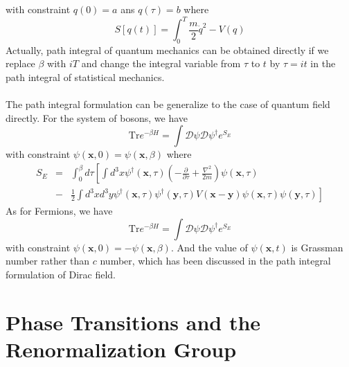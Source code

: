 with constraint $q(0) = a$ ans $q(\tau) = b$
where
\[S[q(t)] = \int_0^{T} \frac{m}{2}\dot{q}^2 - V(q)\]
Actually, path integral of quantum mechanics can be obtained directly if we replace $\beta$ with $iT$ and change the integral variable from $\tau$ to $t$ by $\tau = it$ in the path integral  of statistical mechanics.
\\ \\
The path integral formulation can be generalize to the case of quantum field directly. For the system of bosons, we have
\[\mathrm{Tr}e^{-\beta H} = \int \mathcal{D}\psi \mathcal{D}\psi^{\dagger} e^{S_E}\]
with constraint $\psi(\bm{x},0) = \psi(\bm{x},\beta)$
where
\begin{eqnarray}
S_E &=& \int_0^{\beta}d\tau \left[ \int d^3x \psi^{\dagger}(\bm{x},\tau) \left( -\frac{\partial}{\partial \tau} + \frac{\nabla^2}{2m} \right) \psi(\bm{x},\tau) \right. \nonumber \\
&-& \left. \frac{1}{2}\int d^3x d^3y\psi^{\dagger}(\bm{x},\tau)\psi^{\dagger}(\bm{y},\tau)V(\bm{x}-\bm{y})\psi(\bm{x},\tau)\psi(\bm{y},\tau) \right] \nonumber
\end{eqnarray}
As for Fermions, we have
\[\mathrm{Tr}e^{-\beta H} = \int \mathcal{D}\psi \mathcal{D}\psi^{\dagger} e^{S_E}\]
with constraint $\psi(\bm{x},0) = -\psi(\bm{x},\beta)$. 
And the value of $\psi(\bm{x},t)$ is Grassman number rather than $c$ number, which has been discussed in the path integral formulation of Dirac field.

\chapter{Phase Transitions and the Renormalization Group}
